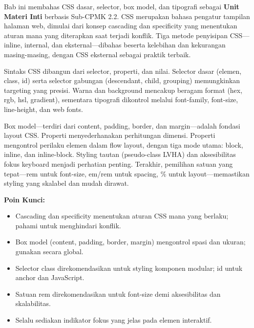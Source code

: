 \documentclass[../main.tex]{subfiles}
\begin{document}
\begin{rangkuman}
Bab ini membahas CSS dasar, selector, box model, dan tipografi sebagai \textbf{Unit Materi Inti} berbasis Sub-CPMK 2.2. CSS merupakan bahasa pengatur tampilan halaman web, dimulai dari konsep cascading dan specificity yang menentukan aturan mana yang diterapkan saat terjadi konflik. Tiga metode penyisipan CSS---inline, internal, dan eksternal---dibahas beserta kelebihan dan kekurangan masing-masing, dengan CSS eksternal sebagai praktik terbaik.

Sintaks CSS dibangun dari selector, properti, dan nilai. Selector dasar (elemen, class, id) serta selector gabungan (descendant, child, grouping) memungkinkan targeting yang presisi. Warna dan background mencakup beragam format (hex, rgb, hsl, gradient), sementara tipografi dikontrol melalui font-family, font-size, line-height, dan web fonts.

Box model---terdiri dari content, padding, border, dan margin---adalah fondasi layout CSS. Properti  menyederhanakan perhitungan dimensi. Properti  mengontrol perilaku elemen dalam flow layout, dengan tiga mode utama: block, inline, dan inline-block. Styling tautan (pseudo-class LVHA) dan aksesibilitas fokus keyboard menjadi perhatian penting. Terakhir, pemilihan satuan yang tepat---rem untuk font-size, em/rem untuk spacing, \% untuk layout---memastikan styling yang skalabel dan mudah dirawat.

\textbf{Poin Kunci:}
\begin{itemize}
  \item Cascading dan specificity menentukan aturan CSS mana yang berlaku; pahami untuk menghindari konflik.
  \item Box model (content, padding, border, margin) mengontrol spasi dan ukuran; gunakan  secara global.
  \item Selector class direkomendasikan untuk styling komponen modular; id untuk anchor dan JavaScript.
  \item Satuan rem direkomendasikan untuk font-size demi aksesibilitas dan skalabilitas.
  \item Selalu sediakan indikator fokus yang jelas pada elemen interaktif.
\end{itemize}
\end{rangkuman}

\ifSubfilesClassLoaded{
  \renewcommand{\bibname}{Daftar Pustaka}
  
  
}{}
\end{document}
